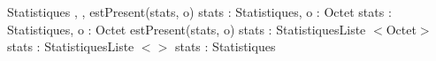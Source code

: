 \begin{algorithme}
        {}{Statistiques}
        {}
        {,
        }
        {}
        {,
        }
        {estPresent(stats, o)}
        {stats : Statistiques, o : Octet}{\booleen}
        {}
        {stats : Statistiques, o : Octet}{\naturelNonNul}
        {estPresent(stats, o)}
        {stats : Statistiques}{Liste $<$Octet$>$}
        {}
        {stats : Statistiques}{Liste $<$\naturelNonNul$>$}
        {}
        {stats : Statistiques}{\naturel}
        {}
\end{algorithme}
